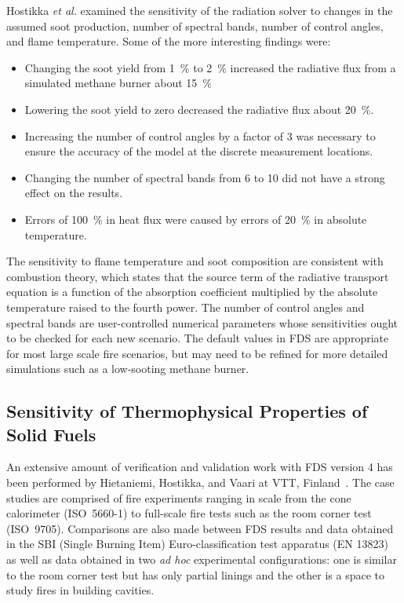 \documentclass[11pt]{book}
\begin{document}
Hostikka {\em et al.} examined the sensitivity of the radiation solver to changes in  the assumed soot production, number  of spectral bands, number
of control  angles, and  flame temperature.  Some of  the more interesting findings were:
\begin{itemize}
\item  Changing  the  soot  yield  from 1~\%  to  2~\%  increased  the
radiative flux from a simulated methane burner about 15~\%
\item Lowering  the soot  yield to zero  decreased the  radiative flux
about 20~\%.
\item Increasing  the number of  control angles by  a factor of  3 was
necessary  to  ensure  the  accuracy  of the  model  at  the  discrete measurement locations.
\item Changing the number of spectral  bands from 6 to 10 did not have
a strong effect on the results.
\item Errors of 100~\% in heat  flux were caused by errors of 20~\% in
absolute temperature.
\end{itemize}
The  sensitivity  to  flame   temperature  and  soot  composition  are consistent with  combustion theory, which states that  the source term of the
radiative transport equation  is a function of  the absorption coefficient  multiplied  by the  absolute  temperature  raised to  the fourth  power.
The  number of  control angles  and spectral  bands are user-controlled numerical  parameters whose sensitivities  ought to be checked  for  each
new  scenario.  The  default  values  in  FDS  are appropriate for  most large scale fire  scenarios, but may  need to be refined for  more detailed
simulations  such as a  low-sooting methane burner.


\subsection{Sensitivity of Thermophysical Properties of Solid Fuels}

An  extensive amount  of  verification and  validation  work with  FDS version 4  has been  performed by Hietaniemi,  Hostikka, and  Vaari at VTT,
Finland~\cite{Hietaniemi:1}. The case  studies are  comprised of fire  experiments   ranging  in   scale  from  the   cone  calorimeter (ISO~5660-1)
to  full-scale fire  tests such as  the room  corner test (ISO~9705).  Comparisons are also  made between  FDS results  and data obtained  in the
SBI (Single  Burning Item)  Euro-classification test apparatus (EN  13823) as  well as  data obtained in  two {\em  ad hoc} experimental
configurations:  one is similar  to the room  corner test but has only  partial linings and the other is a  space to study fires in building
cavities.
\end{document}
